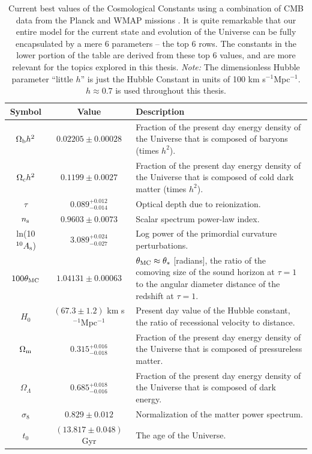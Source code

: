 \begin{table}%
 \begin{center}
    \begin{tabular}{|c|c|p{10cm}|}

      \hline
      Symbol & Value & Description \\ \hline \hline

      $\Omega_{\rm b}h^2$ & $0.02205\pm0.00028$ & Fraction of the present day energy density of the Universe that is composed of baryons (times $h^2$). \\ \hline
      $\Omega_{\rm c}h^2$ & $0.1199\pm0.0027$ & Fraction of the present day energy density of the Universe that is composed of cold dark matter (times $h^2$). \\ \hline
      $\tau$ & $0.089^{+0.012}_{-0.014}$ & Optical depth due to reionization. \\ \hline
      $n_{\rm s}$ & $0.9603\pm0.0073$ & Scalar spectrum power-law index. \\ \hline
      ln(10$^{10}A_{\rm s}$) & $3.089^{+0.024}_{-0.027}$ & Log power of the primordial curvature perturbations. \\ \hline 
      $100\theta_{\rm MC}$ & $1.04131\pm0.00063$ & $\theta_{\rm MC} \approx \theta_*$ [radians], the ratio of the comoving size of the sound horizon at $\tau=1$ to the angular diameter distance of the redshift at $\tau=1$. \\ \hline \hline

      $H_0$ & $(67.3\pm1.2)$ km s$^{-1}$Mpc$^{-1}$ & Present day value of the Hubble constant, the ratio of recessional velocity to distance. \\ \hline
      $\Omega_{\rm m}$ & $0.315^{+0.016}_{-0.018}$ & Fraction of the present day energy density of the Universe that is composed of pressureless matter. \\ \hline
      $\Omega_{\Lambda}$ & $0.685^{+0.018}_{-0.016}$ & Fraction of the present day energy density of the Universe that is composed of dark energy. \\ \hline
      $\sigma_8$ & $0.829\pm0.012$ & Normalization of the matter power spectrum. \\ \hline
      $t_0$ & $(13.817\pm0.048)$ Gyr & The age of the Universe. \\ \hline

    \end{tabular}
  \caption[Cosmological Constants]{Current best values of the Cosmological Constants using a combination of \ac{CMB} data from the \acs{Planck} and \ac{WMAP} missions \citep{PlanckXVI}. It is quite remarkable that our entire model for the current state and evolution of the Universe can be fully encapsulated by a mere 6 parameters -- the top 6 rows. The constants in the lower portion of the table are derived from these top 6 values, and are more relevant for the topics explored in this thesis. {\it Note: }The dimensionless Hubble parameter ``little $h$'' is just the Hubble Constant in units of 100 km s$^{-1}$Mpc$^{-1}$. $h \approx 0.7$ is used throughout this thesis.}
  \label{table:constants}

 \end{center}
\end{table}


